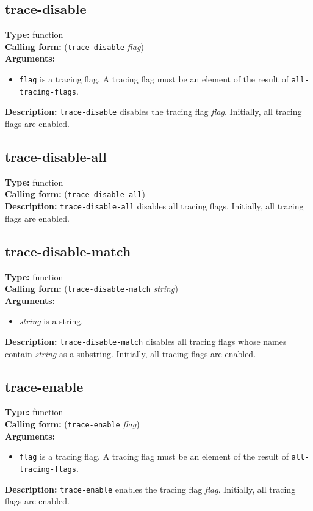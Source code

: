 \documentclass[10pt,a4paper]{report}
\begin{document}
\subsection{trace-disable}
{\bf Type:} function
\\{\bf Calling form:} ({\tt trace-disable} {\em flag})
\\{\bf Arguments:} 
\begin{itemize}
\item {\tt flag} is a tracing flag.  A tracing flag must be an element of the
result of {\tt all-tracing-flags}.
\end{itemize}
{\bf Description:} {\tt trace-disable} disables the tracing flag {\em flag}.
Initially, all tracing flags are enabled.

\subsection{trace-disable-all}
{\bf Type:} function
\\{\bf Calling form:} ({\tt trace-disable-all})
\\{\bf Description:} {\tt trace-disable-all} disables all tracing flags.
Initially, all tracing flags are enabled.


\subsection{trace-disable-match}
{\bf Type:} function
\\{\bf Calling form:} ({\tt trace-disable-match} {\em string})
\\{\bf Arguments:} 
\begin{itemize}
\item {\em string} is a string.
\end{itemize}
{\bf Description:} {\tt trace-disable-match} disables all tracing flags whose
names contain {\em string} as a substring.
Initially, all tracing flags are enabled.

\subsection{trace-enable}
{\bf Type:} function
\\{\bf Calling form:} ({\tt trace-enable} {\em flag})
\\{\bf Arguments:} 
\begin{itemize}
\item {\tt flag} is a tracing flag.  A tracing flag must be an element of the
result of {\tt all-tracing-flags}.
\end{itemize}
{\bf Description:} {\tt trace-enable} enables the tracing flag {\em flag}.
Initially, all tracing flags are enabled.
\end{document}

